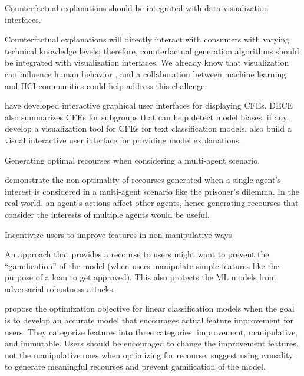 \begin{challenge}\label{ch:visual}
Counterfactual explanations should be integrated with data visualization interfaces. 
\end{challenge}
Counterfactual explanations will directly interact with consumers with varying technical knowledge levels; therefore, counterfactual generation algorithms should be integrated with visualization interfaces. We already know that visualization can influence human behavior \citep{Correll19:Ethical}, and a collaboration between machine learning and HCI communities could help address this challenge. 

\progress
\citet{what-if-tool, dece-visualcfe, vice-visualcfe, advice-visualcfe, Leung-XAI-Customer-Churn-Interface} have developed interactive graphical user interfaces for displaying CFEs. 
DECE~\citep{dece-visualcfe} also summarizes CFEs for subgroups that can help detect model biases, if any. 
\citet{Rivelo-visualcfe} develop a visualization tool for CFEs for text classification models. 
\citet{GAMUT} also build a visual interactive user interface for providing model explanations. 


\begin{challenge}\label{ch:multi-agent}
Generating optimal recourses when considering a multi-agent scenario. 
\end{challenge}
\citet{multi-agent-recourse} demonstrate the non-optimality of recourses generated when a single agent's interest is considered in a multi-agent scenario like the prisoner's dilemma. In the real world, an agent's actions affect other agents, hence generating recourses that consider the interests of multiple agents would be useful. 

\begin{challenge}
Incentivize users to improve features in non-manipulative ways. 
\end{challenge}
An approach that provides a recourse to users might want to prevent the ``gamification'' of the model (when users manipulate simple features like the purpose of a loan to get approved). This also protects the ML models from adversarial robustness attacks. 

\progress
\citet{Chen2020Strategic-recourse-linear} propose the optimization objective for linear classification models when the goal is to develop an accurate model that encourages actual feature improvement for users. They categorize features into three categories: improvement, manipulative, and immutable. Users should be encouraged to change the improvement features, not the manipulative ones when optimizing for recourse. 
\citet{meaningful-recourse-konig} suggest using causality to generate meaningful recourses and prevent gamification of the model. 



